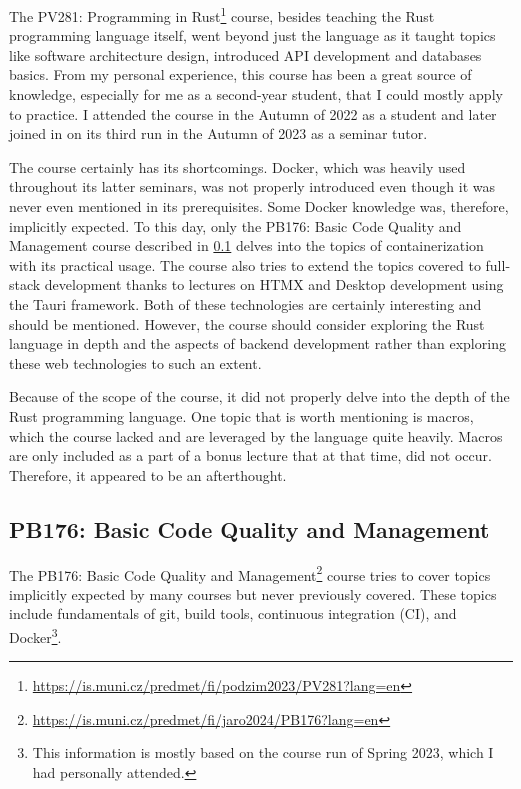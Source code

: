 \documentclass[
  digital,
  color,
  oneside,
  nosansbold,
  nocolorbold,
  nolof,
  nolot,
]{fithesis4}
\begin{document}
The PV281: Programming in Rust\footnote{\url{https://is.muni.cz/predmet/fi/podzim2023/PV281?lang=en}} course, besides teaching the Rust programming language itself, went beyond just the language as it taught topics like software architecture design, introduced API development and databases basics. From my personal experience, this course has been a great source of knowledge, especially for me as a second-year student, that I could mostly apply to practice. I attended the course in the Autumn of 2022 as a student and later joined in on its third run in the Autumn of 2023 as a seminar tutor.

The course certainly has its shortcomings. Docker\cite{docker}, which was heavily used throughout its latter seminars, was not properly introduced even though it was never even mentioned in its prerequisites. Some Docker knowledge was, therefore, implicitly expected. To this day, only the PB176: Basic Code Quality and Management course described in \cref{code-quality-and-management} delves into the topics of containerization with its practical usage. The course also tries to extend the topics covered to full-stack development thanks to lectures on HTMX\cite{bigskysoftware-htmx} and Desktop development using the Tauri framework\cite{tauri-apps-tauri}. Both of these technologies are certainly interesting and should be mentioned. However, the course should consider exploring the Rust language in depth and the aspects of backend development rather than exploring these web technologies to such an extent.

Because of the scope of the course, it did not properly delve into the depth of the Rust programming language. One topic that is worth mentioning is macros, which the course lacked and are leveraged by the language quite heavily. Macros are only included as a part of a bonus lecture that at that time, did not occur. Therefore, it appeared to be an afterthought.

\subsection{PB176: Basic Code Quality and Management}\label{code-quality-and-management}

The PB176: Basic Code Quality and Management\footnote{\url{https://is.muni.cz/predmet/fi/jaro2024/PB176?lang=en}} course tries to cover topics implicitly expected by many courses but never previously covered. These topics include fundamentals of git, build tools, continuous integration (CI), and Docker\footnote{This information is mostly based on the course run of Spring 2023, which I had personally attended.}. 
\end{document}

